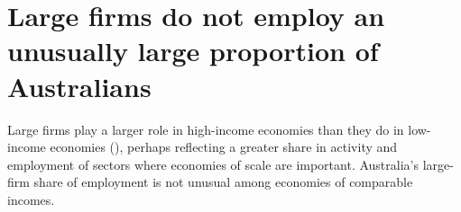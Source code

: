 


    




    





\section{Large firms do not employ an unusually large proportion of Australians}

Large firms play a larger role in high-income economies than they do in low-income economies (), perhaps reflecting a greater share in activity and employment of sectors where economies of scale are important. Australia's large-firm share of employment is not unusual among economies of comparable incomes.  

